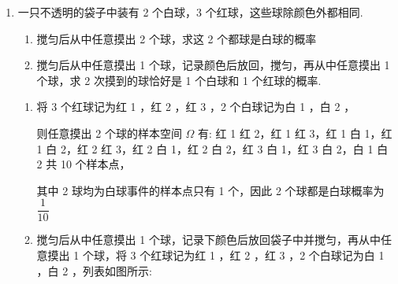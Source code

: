 \begin{enumerate}
\begin{enumerate}
\begin{jieda}
\begin{enumerate}
                事件 $A$ 包含的样本点有 (红球,蓝球),(红球,红球)，(红球，绿球)，共 3 个，
                
                由( 1 )知基本事件总数 $n = 9$ ，所以 $P\left( A\right)  = \dfrac{3}{9} = \dfrac{1}{3}$

                \item 设“第一次取出的是红球且两次取出的球颜色不同”为事件 $B$ .
                
                事件 $B$ 包含的样本点有 (红球,蓝球),(红球,绿球),共 2 个, 由(1)知基本事件总数 $n = 9$，所以 $P\left( B\right)  = \dfrac{2}{9}$
            \end{enumerate}
        \end{jieda}

        \item 一只不透明的袋子中装有 2 个白球，3 个红球，这些球除颜色外都相同.
        \begin{enumerate}
            \item 搅匀后从中任意摸出 2 个球，求这 2 个都球是白球的概率
            \item 搅匀后从中任意摸出 1 个球，记录颜色后放回，搅匀，再从中任意摸出 1 个球，求 2 次摸到的球恰好是 1 个白球和 1 个红球的概率.
        \end{enumerate}
        \begin{jieda}
            \begin{enumerate}
                \item 将 3 个红球记为红 1 ，红 2 ，红 3 ，2 个白球记为白 1 ，白 2 ，
                
                则任意摸出 2 个球的样本空间 $\Omega$ 有: 红 1 红 2，红 1 红 3，红 1 白 1，红 1 白 2，红 2 红 3，红 2 白 1，红 2 白 2，红 3 白 1，红 3 白 2，白 1 白 2 共 10 个样本点，

                其中 2 球均为白球事件的样本点只有 1 个，因此 2 个球都是白球概率为 $\dfrac{1}{10}$

                \item 搅匀后从中任意摸出 1 个球，记录下颜色后放回袋子中并搅匀，再从中任意摸出 1 个球，将 3 个红球记为红 1 ，红 2 ，红 3 ，2 个白球记为白 1 ，白 2 ，列表如图所示:

                \begin{center}
                

\end{center}
\end{enumerate}
\end{jieda}
\end{enumerate}
\end{enumerate}
